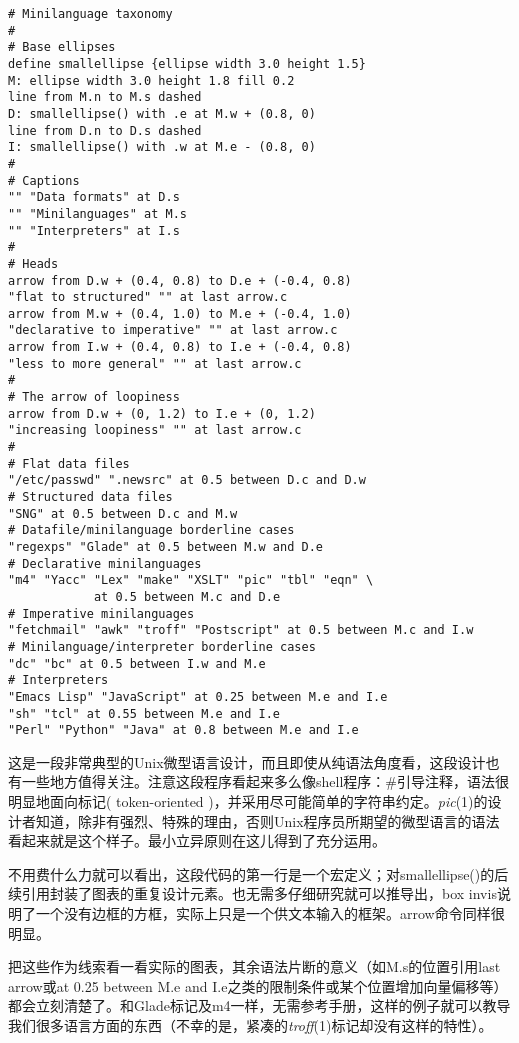 \documentclass[12pt,oneside]{book}
\begin{document}
\begin{common-format}
\begin{Verbatim}[label=例8.4 语言分类图—pic源码]
# Minilanguage taxonomy
#
# Base ellipses
define smallellipse {ellipse width 3.0 height 1.5}
M: ellipse width 3.0 height 1.8 fill 0.2
line from M.n to M.s dashed
D: smallellipse() with .e at M.w + (0.8, 0)
line from D.n to D.s dashed
I: smallellipse() with .w at M.e - (0.8, 0)
#
# Captions
"" "Data formats" at D.s
"" "Minilanguages" at M.s
"" "Interpreters" at I.s
#
# Heads
arrow from D.w + (0.4, 0.8) to D.e + (-0.4, 0.8)
"flat to structured" "" at last arrow.c
arrow from M.w + (0.4, 1.0) to M.e + (-0.4, 1.0)
"declarative to imperative" "" at last arrow.c
arrow from I.w + (0.4, 0.8) to I.e + (-0.4, 0.8)
"less to more general" "" at last arrow.c
#
# The arrow of loopiness
arrow from D.w + (0, 1.2) to I.e + (0, 1.2)
"increasing loopiness" "" at last arrow.c
#
# Flat data files
"/etc/passwd" ".newsrc" at 0.5 between D.c and D.w
# Structured data files
"SNG" at 0.5 between D.c and M.w
# Datafile/minilanguage borderline cases
"regexps" "Glade" at 0.5 between M.w and D.e
# Declarative minilanguages
"m4" "Yacc" "Lex" "make" "XSLT" "pic" "tbl" "eqn" \
			at 0.5 between M.c and D.e
# Imperative minilanguages
"fetchmail" "awk" "troff" "Postscript" at 0.5 between M.c and I.w
# Minilanguage/interpreter borderline cases
"dc" "bc" at 0.5 between I.w and M.e
# Interpreters
"Emacs Lisp" "JavaScript" at 0.25 between M.e and I.e
"sh" "tcl" at 0.55 between M.e and I.e
"Perl" "Python" "Java" at 0.8 between M.e and I.e
\end{Verbatim}


这是一段非常典型的Unix微型语言设计，而且即使从纯语法角度看，这段设计也有一些地方值得关注。注意这段程序看起来多么像shell程序：\#{}引导注释，语法很明显地面向标记( token-oriented )，并采用尽可能简单的字符串约定。\textit{pic}(1)的设计者知道，除非有强烈、特殊的理由，否则Unix程序员所期望的微型语言的语法看起来就是这个样子。最小立异原则在这儿得到了充分运用。

不用费什么力就可以看出，这段代码的第一行是一个宏定义；对smallellipse()的后续引用封装了图表的重复设计元素。也无需多仔细研究就可以推导出，box invis说明了一个没有边框的方框，实际上只是一个供文本输入的框架。arrow命令同样很明显。

把这些作为线索看一看实际的图表，其余语法片断的意义（如M.s的位置引用last arrow或at 0.25 between M.e and I.e之类的限制条件或某个位置增加向量偏移等）都会立刻清楚了。和Glade标记及m4一样，无需参考手册，这样的例子就可以教导我们很多语言方面的东西（不幸的是，紧凑的\textit{troff}(1)标记却没有这样的特性）。


\end{common-format}
\end{document}
